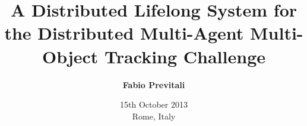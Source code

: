 \documentclass{beamer}
\title[A Distributed Lifelong System for the Distributed MAMOT Challenge]{\large A Distributed Lifelong System for the Distributed Multi-Agent Multi-Object Tracking Challenge}
\subtitle{}
\author[Fabio Previtali]{\Large\textbf{Fabio Previtali}}
\date[15th October 2013]{15th October 2013\\Rome, Italy}
\begin{document}
\begin{frame}[plain]
	\titlepage
\end{frame}








\tiny


\end{document}
